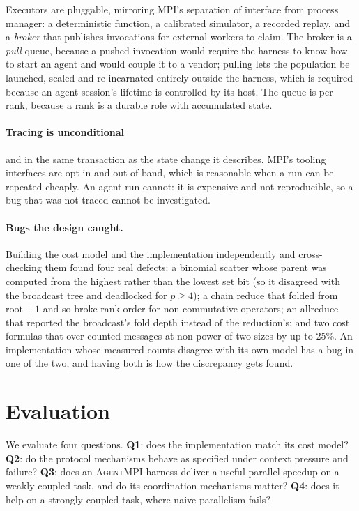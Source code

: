 \documentclass[10pt,twocolumn]{article}
\theoremstyle{definition}
\theoremstyle{plain}
\newcommand{\ampi}{\textsc{AgentMPI}}
\begin{document}
Executors are pluggable, mirroring MPI's separation of interface from process
manager: a deterministic function, a calibrated simulator, a recorded replay, and a
\emph{broker} that publishes invocations for external workers to claim. The broker
is a \emph{pull} queue, because a pushed invocation would require the harness to
know how to start an agent and would couple it to a vendor; pulling lets the
population be launched, scaled and re-incarnated entirely outside the harness,
which is required because an agent session's lifetime is controlled by its host.
The queue is per rank, because a rank is a durable role with accumulated state.

\paragraph{Tracing is unconditional} and in the same transaction as the state change
it describes. MPI's tooling interfaces are opt-in and out-of-band, which is
reasonable when a run can be repeated cheaply. An agent run cannot: it is expensive
and not reproducible, so a bug that was not traced cannot be investigated.

\paragraph{Bugs the design caught.} Building the cost model and the implementation
independently and cross-checking them found four real defects: a binomial scatter
whose parent was computed from the highest rather than the lowest set bit (so it
disagreed with the broadcast tree and deadlocked for $p\geq4$); a chain reduce that
folded from $\text{root}+1$ and so broke rank order for non-commutative operators;
an allreduce that reported the broadcast's fold depth instead of the reduction's;
and two cost formulas that over-counted messages at non-power-of-two sizes by up to
25\%. An implementation whose measured counts disagree with its own model has a bug
in one of the two, and having both is how the discrepancy gets found.

\section{Evaluation}
\label{sec:eval}

We evaluate four questions. \textbf{Q1}: does the implementation match its cost
model? \textbf{Q2}: do the protocol mechanisms behave as specified under context
pressure and failure? \textbf{Q3}: does an \ampi{} harness deliver a useful
parallel speedup on a weakly coupled task, and do its coordination mechanisms
matter? \textbf{Q4}: does it help on a strongly coupled task, where naive
parallelism fails?
\end{document}
